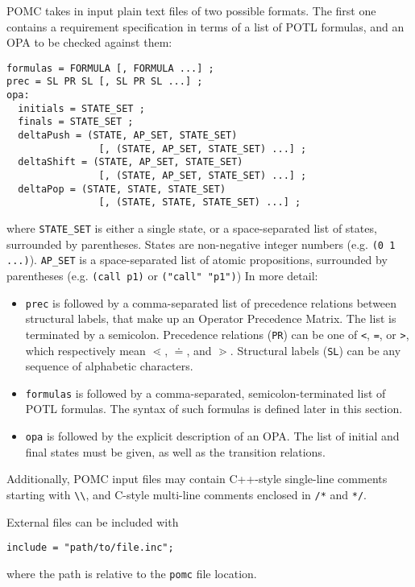 \documentclass{article}
\begin{document}
POMC takes in input plain text files of two possible formats.
The first one contains a requirement specification in terms of a list of
POTL formulas, and an OPA to be checked against them:
\begin{verbatim}
formulas = FORMULA [, FORMULA ...] ;
prec = SL PR SL [, SL PR SL ...] ;
opa:
  initials = STATE_SET ;
  finals = STATE_SET ;
  deltaPush = (STATE, AP_SET, STATE_SET)
                [, (STATE, AP_SET, STATE_SET) ...] ;
  deltaShift = (STATE, AP_SET, STATE_SET)
                [, (STATE, AP_SET, STATE_SET) ...] ;
  deltaPop = (STATE, STATE, STATE_SET)
                [, (STATE, STATE, STATE_SET) ...] ;
\end{verbatim}
where \texttt{STATE\_SET} is either a single state, or a space-separated list of states,
surrounded by parentheses.
States are non-negative integer numbers (e.g. \texttt{(0 1 ...)}).
\texttt{AP\_SET} is a space-separated list of atomic propositions, surrounded by parentheses
(e.g. \texttt{(call p1)} or \texttt{("call" "p1")})
In more detail:
\begin{itemize}
\item \texttt{prec}
  is followed by a comma-separated list of precedence relations between structural labels,
  that make up an Operator Precedence Matrix.
  The list is terminated by a semicolon.
  Precedence relations (\texttt{PR}) can be one of \texttt{<}, \texttt{=}, or \texttt{>},
  which respectively mean $\lessdot$, $\doteq$, and $\gtrdot$.
  Structural labels (\texttt{SL}) can be any sequence of alphabetic characters.
\item \texttt{formulas}
  is followed by a comma-separated, semicolon-terminated list of POTL formulas.
  The syntax of such formulas is defined later in this section.
\item \texttt{opa}
  is followed by the explicit description of an OPA.
  The list of initial and final states must be given, as well as the transition relations.
\end{itemize}

Additionally, POMC input files may contain C++-style single-line comments
starting with \verb|\\|, and C-style multi-line comments enclosed in
\verb|/*| and \verb|*/|.

External files can be included with
\begin{verbatim}
include = "path/to/file.inc";
\end{verbatim}
where the path is relative to the \texttt{pomc} file location.
\end{document}
